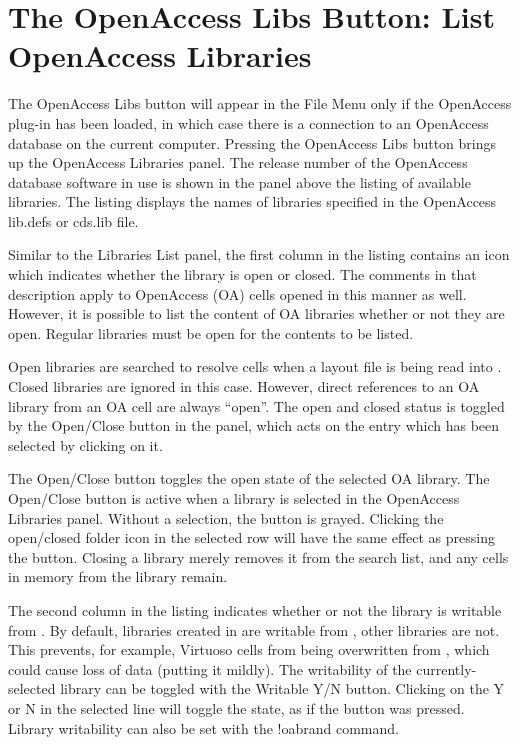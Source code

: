 \section{The {\cb OpenAccess Libs} Button:  List OpenAccess Libraries}
\label{oalibs}

The {\cb OpenAccess Libs} button will appear in the {\cb File Menu}
only if the OpenAccess plug-in has been loaded, in which case there is
a connection to an OpenAccess database on the current computer. 
Pressing the {\cb OpenAccess Libs} button brings up the {\cb
OpenAccess Libraries} panel.  The release number of the OpenAccess
database software in use is shown in the panel above the listing of
available libraries.  The listing displays the names of libraries
specified in the OpenAccess {\vt lib.defs} or {\vt cds.lib} file.

Similar to the {\cb Libraries List} panel, the first column in the
listing contains an icon which indicates whether the library is open
or closed.  The comments in that description apply to OpenAccess (OA)
cells opened in this manner as well.  However, it is possible to list
the content of OA libraries whether or not they are open.  Regular
libraries must be open for the contents to be listed.

Open libraries are searched to resolve cells when a layout file is
being read into {\Xic}.  Closed libraries are ignored in this case. 
However, direct references to an OA library from an OA cell are always
``open''.  The open and closed status is toggled by the {\cb
Open/Close} button in the panel, which acts on the entry which has
been selected by clicking on it.

The {\cb Open/Close} button toggles the open state of the selected OA
library.  The {\cb Open/Close} button is active when a library is
selected in the {\cb OpenAccess Libraries} panel.  Without a
selection, the button is grayed.  Clicking the open/closed folder icon
in the selected row will have the same effect as pressing the button. 
Closing a library merely removes it from the search list, and any
cells in memory from the library remain.

The second column in the listing indicates whether or not the library
is writable from {\Xic}.  By default, libraries created in {\Xic} are
writable from {\Xic}, other libraries are not.  This prevents, for
example, Virtuoso cells from being overwritten from {\Xic}, which
could cause loss of data (putting it mildly).  The writability of the
currently-selected library can be toggled with the {\cb Writable Y/N}
button.  Clicking on the {\cb Y} or {\cb N} in the selected line will
toggle the state, as if the button was pressed.  Library writability
can also be set with the {\cb !oabrand} command.

